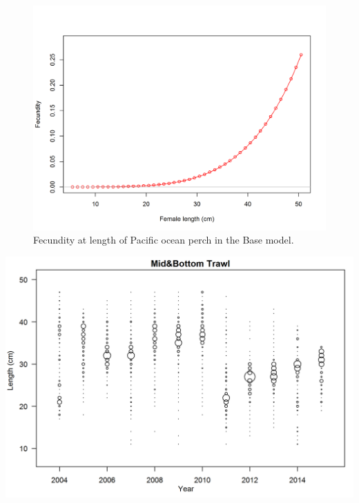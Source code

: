 \documentclass[12pt,]{article}
\begin{document}
\begin{figure}
\centering
\includegraphics{r4ss/plots_mod1/bio9_fecundity_len.png}
\caption{Fecundity at length of Pacific ocean perch in the Base model.
\label{fig:fecundity}}
\end{figure}

\FloatBarrier  \includegraphics{Figures/discardLengthComps.png}
\end{document}
